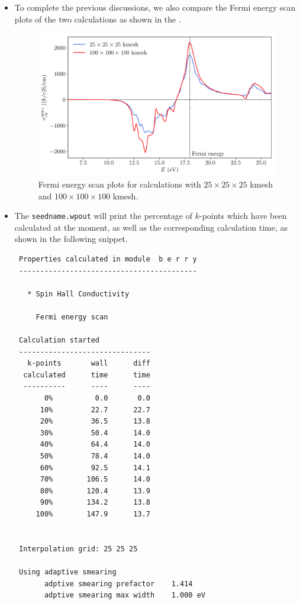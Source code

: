 \begin{itemize}
\item To complete the previous discussions, we also
compare the Fermi energy scan plots of the two calculations as
shown in the .
\begin{figure}[!htb]
\centering
\includegraphics[width=.8\columnwidth]{figure/example29/pt_shc_kmesh.pdf}
\caption{Fermi energy scan plots for calculations
	with $25\times25\times25$ kmesh and $100\times100\times100$ kmesh.}
\label{fig29.3}
\end{figure}

\item The {\tt seedname.wpout} will print the percentage of $k$-points which
have been calculated at the moment, as well as the corresponding calculation time, as
shown in the following snippet.

\begin{tcolorbox}[title=Pt.wpout,sharp corners,boxrule=0.5pt]
{\small
\begin{verbatim}
 Properties calculated in module  b e r r y
 ------------------------------------------

   * Spin Hall Conductivity

     Fermi energy scan

 Calculation started
 -------------------------------
   k-points       wall      diff
  calculated      time      time
  ----------      ----      ----
       0%          0.0       0.0
      10%         22.7      22.7
      20%         36.5      13.8
      30%         50.4      14.0
      40%         64.4      14.0
      50%         78.4      14.0
      60%         92.5      14.1
      70%        106.5      14.0
      80%        120.4      13.9
      90%        134.2      13.8
     100%        147.9      13.7


 Interpolation grid: 25 25 25

 Using adaptive smearing
       adptive smearing prefactor    1.414
       adptive smearing max width    1.000 eV


\end{verbatim}}
\end{tcolorbox}
\end{itemize}
